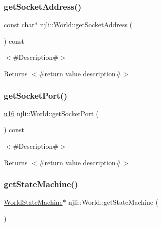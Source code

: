 \subsubsection{\texorpdfstring{get\+Socket\+Address()}{getSocketAddress()}}
{\footnotesize\ttfamily const char$\ast$ njli\+::\+World\+::get\+Socket\+Address (\begin{DoxyParamCaption}{ }\end{DoxyParamCaption}) const}

$<$\#\+Description\#$>$

\begin{DoxyReturn}{Returns}
$<$\#return value description\#$>$ 
\end{DoxyReturn}
\mbox{\label{classnjli_1_1_world_af108b41273b0ff7abbf88fa6e311304e}} 
\subsubsection{\texorpdfstring{get\+Socket\+Port()}{getSocketPort()}}
{\footnotesize\ttfamily \mbox{\hyperlink{_util_8h_a9e6c91d77e24643b888dbd1a1a590054}{u16}} njli\+::\+World\+::get\+Socket\+Port (\begin{DoxyParamCaption}{ }\end{DoxyParamCaption}) const}

$<$\#\+Description\#$>$

\begin{DoxyReturn}{Returns}
$<$\#return value description\#$>$ 
\end{DoxyReturn}
\mbox{\label{classnjli_1_1_world_a779f9ee41d7e73e013654dcdb1d83cf9}} 
\subsubsection{\texorpdfstring{get\+State\+Machine()}{getStateMachine()}\hspace{0.1cm}{\footnotesize\ttfamily [1/2]}}
{\footnotesize\ttfamily \mbox{\hyperlink{classnjli_1_1_world_state_machine}{World\+State\+Machine}}$\ast$ njli\+::\+World\+::get\+State\+Machine (\begin{DoxyParamCaption}{ }\end{DoxyParamCaption})}

